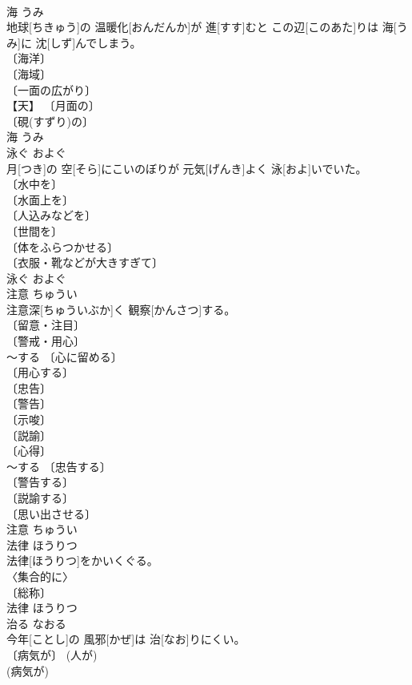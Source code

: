 \documentclass[8pt]{extreport}
\begin{document}
\begin{CJK}{UTF8}{min}
\\	海	うみ	
\\	地球[ちきゅう]の 温暖化[おんだんか]が 進[すす]むと この辺[このあた]りは 海[うみ]に 沈[しず]んでしまう。	
\\	〔海洋〕 
\\	〔海域〕 
\\	〔一面の広がり〕 
\\	【天】 〔月面の〕 
\\	〔硯(すずり)の〕 
\\	海	うみ	
\\	泳ぐ	およぐ	
\\	月[つき]の 空[そら]にこいのぼりが 元気[げんき]よく 泳[およ]いでいた。	
\\	〔水中を〕 
\\	〔水面上を〕 
\\	〔人込みなどを〕 
\\	〔世間を〕 
\\	〔体をふらつかせる〕 
\\	〔衣服・靴などが大きすぎて〕 
\\	泳ぐ	およぐ	
\\	注意	ちゅうい	
\\	注意深[ちゅういぶか]く 観察[かんさつ]する。	
\\	〔留意・注目〕 
\\	〔警戒・用心〕 
\\	～する 〔心に留める〕 
\\	〔用心する〕 
\\	〔忠告〕 
\\	〔警告〕 
\\	〔示唆〕 
\\	〔説諭〕 
\\	〔心得〕 
\\	～する 〔忠告する〕 
\\	〔警告する〕 
\\	〔説諭する〕 
\\	〔思い出させる〕 
\\	注意	ちゅうい	
\\	法律	ほうりつ	
\\	法律[ほうりつ]をかいくぐる。	
\\	〈集合的に〉 
\\	〔総称〕 
\\	法律	ほうりつ	
\\	治る	なおる	
\\	今年[ことし]の 風邪[かぜ]は 治[なお]りにくい。	
\\	〔病気が〕 (人が) 
\\	(病気が) 

\end{CJK}
\end{document}
